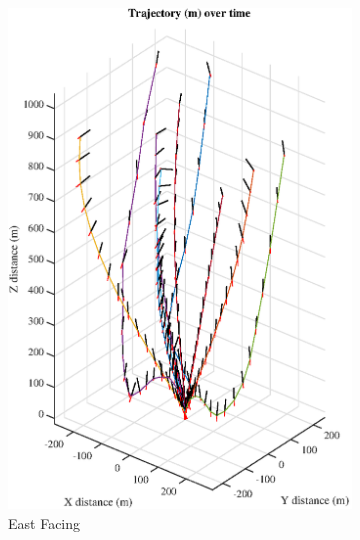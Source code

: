 \begin{figure}[htpb!]
\begin{subfigure}{.5\textwidth}
  \centering
  \includegraphics[width=1\linewidth]{figs/monte1.eps}
  \caption{East Facing}
  \label{fig:monte1}
\end{subfigure}%
\begin{subfigure}{.5\textwidth}
  \centering

\end{subfigure}
\end{figure}
